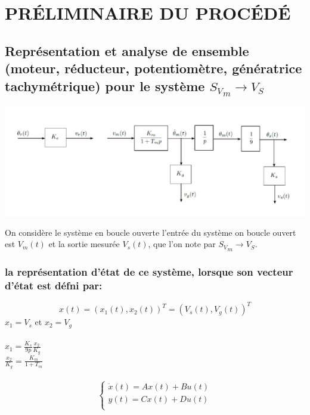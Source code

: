  \chapter{ PRÉLIMINAIRE DU PROCÉDÉ}
   \section{Représentation et analyse de ensemble (moteur, réducteur, potentiomètre, génératrice        tachymétrique) pour le système $ {S_V}_m \rightarrow V_S$ }
 

\begin{center}
\includegraphics[scale=0.5]{fiiig2.png}
\label{fig1} 
\end{center}

On considère le système en boucle ouverte l’entrée du système on boucle ouvert est $V_m(t)$ et la sortie mesurée $V_s(t)$, que l’on note  par $ {S_V}_m \rightarrow V_S$.


\subsection{la représentation d’état de ce système, lorsque son vecteur d’état est défni par:}


\begin{equation}
x(t)={(x_1(t),x_2(t))}^T={(V_s(t),V_g(t))}^T
\end{equation}
$x_1=V_s$ et $x_2=V_g$
\\\\


$x_1=\frac{K_s}{9p}\frac{x_2}{K_g}$\\
$\frac{x_2}{K_g}=\frac{K_m}{1+T_m}$
\\
\\

\begin{equation*}
\left\{\begin{matrix}
\dot{x}(t)=Ax(t)+Bu(t)\\ 
y(t)=Cx(t)+Du(t)\\
\end{matrix}\right.
\end{equation*}   

